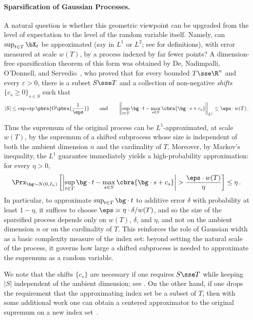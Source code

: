 \documentclass[11pt]{article}
\begin{document}
\paragraph{Sparsification of Gaussian Processes.} 

A natural question is whether this geometric viewpoint can be upgraded from the level of expectation to the level of the random variable itself. 
Namely, can $\sup_{t\in T}\bX_t$ be approximated (say in $L^1$ or $L^2$; see  for definitions), with error measured at scale $w(T)$, by a process indexed by far fewer points? 
A dimension-free sparsification theorem of this form was obtained by De, Nadimpalli, O'Donnell, and Servedio~\cite[Theorem~1]{de2026sparsifying}, who proved that for every bounded $T\sse \R^n$ and every $\varepsilon>0$, there is a subset $S\sse T$ and a collection of non-negative \emph{shifts} $\{c_s\geq 0\}_{s\in S}$ such that 
\[
    |S| \leq \exp\exp\pbra{O\pbra{\frac{1}{\eps}}}
    \qquad\text{and}\qquad 
    \left\|
    \sup_{t\in T} \bg\cdot t
    -
    \max_{s\in S} \cbra{\bg\cdot s + c_s}
    \right\|_{L^1}
    \leq
    \eps\cdot w(T)\,.
\] 

Thus the supremum of the original process can be $L^1$-approximated, at scale $w(T)$, by the supremum of a shifted subprocess whose size is independent of both the ambient dimension $n$ and the cardinality of $T$. 
Moreover, by Markov's inequality, the $L^1$ guarantee immediately yields a high-probability approximation: for every $\eta>0$, 
\[
	\Prx_{\bg\sim N(0, I_n)}\left[
	\left|
    \sup_{t\in T} \bg\cdot t
    -
    \max_{s\in S} \cbra{\bg\cdot s + c_s}
	\right|
	>
	\frac{\eps\cdot w(T)}{\eta}
	\right]
	\leq \eta\,.
\]
In particular, to approximate $\sup_{t\in T}\bg\cdot t$ to additive error $\delta$ with probability at least $1-\eta$, it suffices to choose $\eps \asymp \eta\cdot\delta/w(T)$, and so the size of the sparsified process depends only on $w(T)$, $\delta$, and $\eta$, and not on the ambient dimension $n$ or on the cardinality of $T$. 
This reinforces the role of Gaussian width as a basic complexity measure of the index set: beyond setting the natural scale of the process, it governs how large a shifted subprocess is needed to approximate the supremum as a random variable. 

We note that the shifts $\{c_s\}$ are necessary if one requires $S\sse T$ while keeping $|S|$ independent of the ambient dimension; see \cite[Example~32]{de2026sparsifying}. 
On the other hand, if one drops the requirement that the approximating index set be a subset of $T$, then with some additional work one can obtain a centered approximator to the original supremum on a new index set~\cite[Corollary~23]{de2026sparsifying}.  
\end{document}
